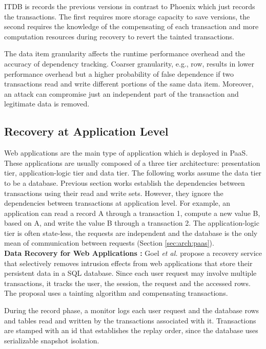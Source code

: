 ITDB is records the previous versions in contrast to Phoenix which just records the transactions. The first requires more storage capacity to save versions, the second requires the knowledge of the compensating of each transaction and more computation resources during recovery to revert the tainted transactions.

The data item granularity affects the runtime performance overhead and the accuracy of dependency tracking. Coarser granularity, e.g., row, results in lower performance overhead but a higher probability of false dependence if two transactions read and write different portions of the same data item. Moreover, an attack can compromise just an independent part of the transaction and legitimate data is removed. 




\subsection{Recovery at Application Level}
\label{sec:related:recovery_app}

Web applications are the main type of application which is deployed in \ac{PaaS}. These applications are usually composed of a three tier architecture: presentation tier, application-logic tier and data tier. The following works assume the data tier to be a database. 
Previous section works establish the dependencies between transactions using their read and write sets. However, they ignore the dependencies between transactions at application level. For example, an application can read a record A through a transaction 1, compute a new value B, based on A, and write the value B through a transaction 2. The application-logic tier is often state-less, the requests are independent and the database is the only mean of communication between requests (Section \ref{sec:arch:paas}).\\ 


\textbf{Data Recovery for Web Applications \cite{goel}:} Goel \textit{et al.} propose a recovery service that selectively removes intrusion effects from web applications that store their persistent data in a \ac{SQL} database. Since each user request may involve multiple transactions, it tracks the user, the session, the request and the accessed rows. The proposal uses a tainting algorithm and compensating transactions.

During the record phase, a monitor logs each user request and the database rows and tables read and written by the transactions associated with it. Transactions are stamped with an id that establishes the replay order, since the database uses serializable snapshot isolation.

